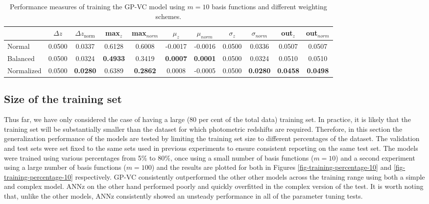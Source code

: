 \documentclass[useAMS,usenatbib,fleqn]{mn2e}
\begin{document}
 \begin{table}
\caption{Performance measures of training the GP-VC model using $m=10$ basis functions and different weighting schemes.}
\begin{center}
\begin{tabular}{| l | c | c |  c | c |  c | c |  c | c |  c | c | }
     				&	$\Delta z$	&	$\Delta z_\textrm{norm}$	&	max$_{z}$ & max$_{norm}$		&	$\mu_{z}$&	$\mu_{norm}$	& $\sigma_{z}$ & $\sigma_{norm}$ & out$_{z}$&out$_{norm}$\\	\hline
	Normal		&	0.0500	&	0.0337		&	0.6128		&	0.6008&	-0.0017		&	-0.0016&	0.0500		&	0.0336&	0.0507		&	0.0507\\
	Balanced		&	0.0500 	&	0.0324		&	\textbf{0.4933}	&	0.3419&	\textbf{0.0007}		&	\textbf{0.0001}&	0.0500		&	0.0324&	0.0510 	&	0.0510	\\
	Normalized	&	0.0500 	&	\textbf{0.0280}	&	0.6389		&	\textbf{0.2862}&	0.0008			&	-0.0005&	0.0500		&	\textbf{0.0280}&	\textbf{0.0458}	&	\textbf{0.0498	}\\\hline
  \end{tabular}
\end{center}
\label{table-normal-balanced}
\end{table}

\subsection{Size of the training set}
\label{sec-sizetraining}

Thus far, we have only considered the case of having a large (80 per cent of the total data) training set. In practice, it is likely that the training set will be substantially smaller than the dataset for which photometric redshifts are required. Therefore, in this section the generalization performance of the models are tested by limiting the training set size to different percentages of the dataset. The validation and test sets were set fixed to the same sets used in previous experiments to ensure consistent reporting on the same test set. The models were trained using various percentages from 5\% to 80\%, once using a small number of basis functions ($m=10$) and a second experiment using a large number of basis functions ($m=100$) and the results are plotted for both in Figures \ref{fig-training-percentage-10} and \ref{fig-training-percentage-10} respectively. GP-VC consistently outperformed the other other models across the training range using both a simple and complex model. {ANNz} on the other hand performed poorly and quickly overfitted in the complex version of the test. It is worth noting that, unlike the other models, {ANNz} consistently showed an unsteady performance in all of the parameter tuning tests.
\end{document}
